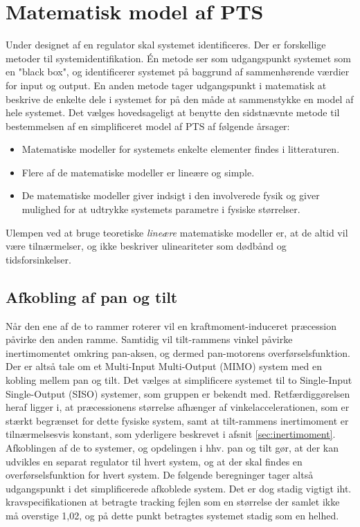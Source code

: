 \section{Matematisk model af PTS}
\label{sec:matPTS}
Under designet af en regulator skal systemet identificeres. Der er forskellige metoder til systemidentifikation.
Én metode ser som udgangspunkt systemet som en "black box", og identificerer systemet
på baggrund af sammenhørende værdier for input og output.
En anden metode tager udgangspunkt i matematisk at beskrive de enkelte dele i systemet
for på den måde at sammenstykke en model af hele systemet.
Det vælges hovedsageligt at benytte den sidstnævnte metode til bestemmelsen af en simplificeret
model af PTS af følgende årsager:
\begin{itemize}
\itemsep1pt
\item Matematiske modeller for systemets enkelte elementer findes i litteraturen.
\item Flere af de matematiske modeller er lineære og simple.
\item De matematiske modeller giver indsigt i den involverede fysik og giver mulighed
	for at udtrykke systemets parametre i fysiske størrelser.
\end{itemize}
Ulempen ved at bruge teoretiske \textit{lineære} matematiske modeller er,
at de altid vil være tilnærmelser, og ikke beskriver ulineariteter som dødbånd og tidsforsinkelser.

\subsection{Afkobling af pan og tilt}
Når den ene af de to rammer roterer vil en kraftmoment-induceret præcession påvirke den anden ramme.
Samtidig vil tilt-rammens vinkel påvirke inertimomentet omkring pan-aksen, og dermed
pan-motorens overførselsfunktion.
Der er altså tale om et Multi-Input Multi-Output (MIMO) system med en kobling mellem pan og tilt.
Det vælges at simplificere systemet til to Single-Input Single-Output (SISO) systemer, som gruppen er bekendt med.
Retfærdiggørelsen heraf ligger i, at præcessionens størrelse afhænger af vinkelaccelerationen, som er stærkt begrænset
for dette fysiske system, samt at tilt-rammens inertimoment er tilnærmelsesvis konstant, som yderligere beskrevet i afsnit \ref{sec:inertimoment}.
Afkoblingen af de to systemer, og opdelingen i hhv. pan og tilt gør, at der kan udvikles en separat regulator
til hvert system, og at der skal findes en overførselsfunktion for hvert system.
De følgende beregninger tager altså udgangspunkt i det simplificerede afkoblede system.
Det er dog stadig vigtigt iht. kravspecifikationen at betragte tracking fejlen som en størrelse der samlet
ikke må overstige 1,02\degree, og på dette punkt betragtes systemet stadig som en helhed.

